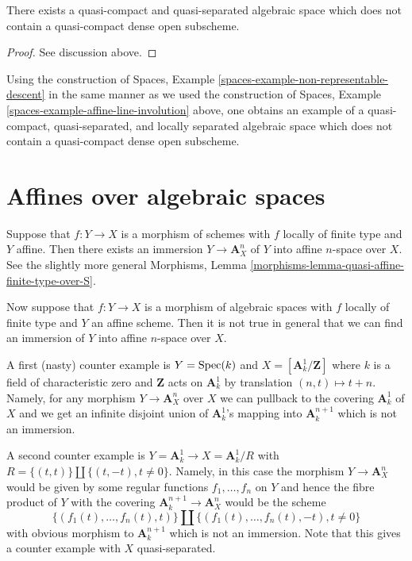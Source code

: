 \begin{lemma}
\label{lemma-nonexistence-qc-dense-open-subscheme}
There exists a quasi-compact and quasi-separated algebraic space
which does not contain a quasi-compact dense open subscheme.
\end{lemma}

\begin{proof}
See discussion above.
\end{proof}

\noindent
Using the construction of 
Spaces, Example \ref{spaces-example-non-representable-descent}
in the same manner as we used the construction of
Spaces, Example \ref{spaces-example-affine-line-involution}
above, one obtains an example of a quasi-compact, quasi-separated, and
locally separated algebraic space which does not contain a quasi-compact
dense open subscheme.


\section{Affines over algebraic spaces}
\label{section-embedding-affines}

\medskip\noindent
Suppose that $f : Y \to X$ is a morphism of schemes with $f$
locally of finite type and $Y$ affine. Then there exists an immersion
$Y \to \mathbf{A}^n_X$ of $Y$ into affine $n$-space over $X$.
See the slightly more general
Morphisms, Lemma \ref{morphisms-lemma-quasi-affine-finite-type-over-S}.

\medskip\noindent
Now suppose that $f : Y \to X$ is a morphism of algebraic spaces with
$f$ locally of finite type and $Y$ an affine scheme. Then it is not
true in general that we can find an immersion of $Y$ into affine
$n$-space over $X$.

\medskip\noindent
A first (nasty) counter example is $Y = \mathop{\mathrm{Spec}}(k)$ and
$X = [\mathbf{A}^1_k/\mathbf{Z}]$ where $k$ is a field of characteristic zero
and $\mathbf{Z}$ acts on $\mathbf{A}^1_k$ by translation $(n, t) \mapsto t + n$.
Namely, for any morphism $Y \to \mathbf{A}^n_X$ over $X$ we can pullback to
the covering $\mathbf{A}^1_k$ of $X$ and we get an infinite disjoint union of
$\mathbf{A}^1_k$'s mapping into $\mathbf{A}^{n + 1}_k$ which is not an
immersion.

\medskip\noindent
A second counter example is $Y = \mathbf{A}^1_k \to X = \mathbf{A}^1_k/R$
with $R = \{(t, t)\} \amalg \{(t, -t), t \not = 0\}$. Namely, in
this case the morphism $Y \to \mathbf{A}^n_X$ would be given by some
regular functions $f_1, \ldots, f_n$ on $Y$ and hence the
fibre product of $Y$ with the covering
$\mathbf{A}^{n + 1}_k \to \mathbf{A}^n_X$
would be the scheme
$$
\{(f_1(t), \ldots, f_n(t), t)\} \amalg
\{(f_1(t), \ldots, f_n(t), -t), t \not = 0\}
$$
with obvious morphism to $\mathbf{A}^{n + 1}_k$ which is not an immersion.
Note that this gives a counter example with $X$ quasi-separated.


